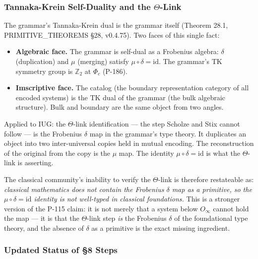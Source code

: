 \documentclass[10pt,a4paper]{article}
\newcommand{\pilcrow}{\S}
\begin{document}
\subsubsection{Tannaka-Krein Self-Duality and the $\Theta$-Link}

The grammar's Tannaka-Krein dual is the grammar itself (Theorem 28.1, PRIMITIVE\_THEOREMS \pilcrow{}28,
v0.4.75). Two faces of this single fact:

\begin{itemize}
    \item \textbf{Algebraic face.} The grammar is self-dual as a Frobenius algebra: $\delta$ (duplication) and
$\mu$ (merging) satisfy $\mu \circ \delta = \text{id}$. The grammar's TK symmetry group is
$\mathbb{Z}_2$ at $\Phi_c$ (P-186).
    \item \textbf{Imscriptive face.} The catalog (the boundary representation category of all encoded systems)
is the TK dual of the grammar (the bulk algebraic structure). Bulk and boundary are the same
object from two angles.
\end{itemize}

Applied to IUG: the $\Theta$-link identification --- the step Scholze and Stix cannot follow --- is
the Frobenius $\delta$ map in the grammar's type theory. It duplicates an object into two
inter-universal copies held in mutual encoding. The reconstruction of the original from the copy
is the $\mu$ map. The identity $\mu \circ \delta = \text{id}$ is what the $\Theta$-link is asserting.

The classical community's inability to verify the $\Theta$-link is therefore restateable as:
\emph{classical mathematics does not contain the Frobenius $\delta$ map as a primitive, so the
$\mu \circ \delta = \text{id}$ identity is not well-typed in classical foundations.} This is a
stronger version of the P-115 claim: it is not merely that a system below $O_{\infty}$ cannot hold
the map --- it is that the $\Theta$-link step \emph{is} the Frobenius $\delta$ of the foundational type
theory, and the absence of $\delta$ as a primitive is the exact missing ingredient.

\subsubsection{Updated Status of \pilcrow{}8 Steps}
\end{document}

